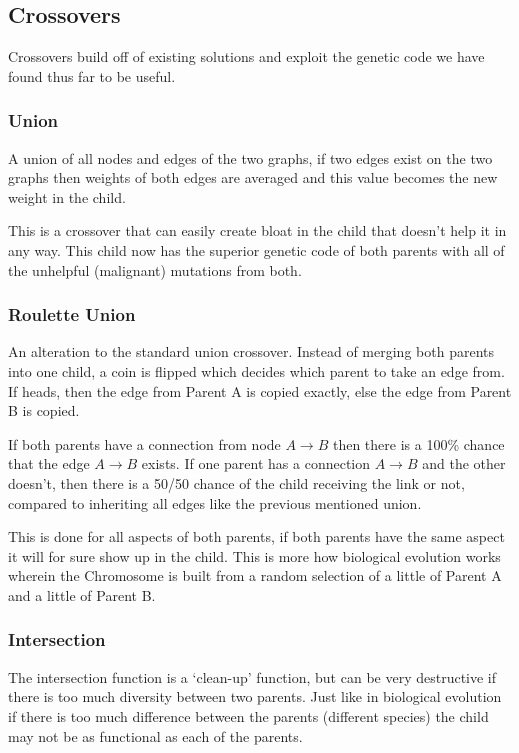 \documentclass[journal]{IEEEtran}
\begin{document}
  \subsection{Crossovers}
  Crossovers build off of existing solutions and exploit the genetic code we have found thus far to be useful.
    \subsubsection{Union}
    A union of all nodes and edges of the two graphs, if two edges exist on the two graphs then
    weights of both edges are averaged and this value becomes the new weight in the child.

    This is a crossover that can easily create bloat in the child that doesn't help it in any way.
    This child now has the superior genetic code of both parents with all of the unhelpful (malignant)
    mutations from both. \cite{lachlan} %

    \subsubsection{Roulette Union}
    An alteration to the standard union crossover. Instead of merging both parents into
    one child, a coin is flipped which decides which parent to take an edge from. If heads, then
    the edge from Parent A is copied exactly, else the edge from Parent B is copied.

    If both parents have a connection from node $ A \rightarrow B $ then there is a 100\% chance
    that the edge $A \rightarrow B$ exists. If one parent has a connection $A \rightarrow B$ and
    the other doesn't, then there is a 50/50 chance of the child receiving the link or not,
    compared to inheriting all edges like the previous mentioned union.

    This is done for all aspects of both parents, if both parents have the same aspect it will
    for sure show up in the child. This is more how biological evolution works wherein the
    Chromosome is built from a random selection of a little of Parent A and a little of Parent B.


    \subsubsection{Intersection}
    The intersection function is a `clean-up' function, but can be very destructive if there
    is too much diversity between two parents. Just like in biological evolution if there is
    too much difference between the parents (different species) the child may not be as functional
    as each of the parents.
\end{document}

